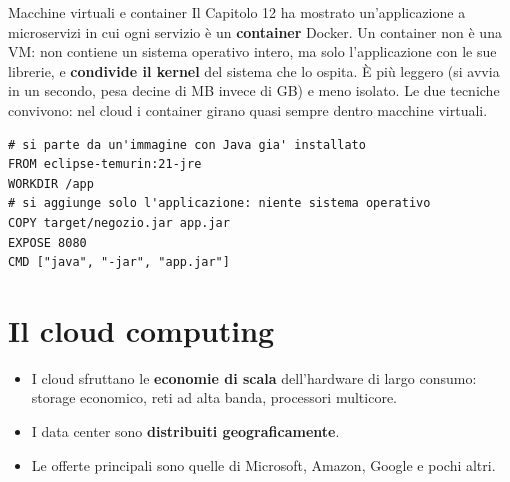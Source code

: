 \begin{infobox}{{Macchine virtuali e container}}
  Il Capitolo 12 ha mostrato un'applicazione a microservizi in cui ogni servizio è un \textbf{container} Docker. Un
  container non è una VM: non contiene un sistema operativo intero, ma solo l'applicazione con le sue librerie, e
  \textbf{condivide il kernel} del sistema che lo ospita. È più leggero (si avvia in un secondo, pesa decine di MB invece
  di GB) e meno isolato. Le due tecniche convivono: nel cloud i container girano quasi sempre dentro macchine virtuali.
\begin{lstlisting}[style=docker, name=Dockerfile]
# si parte da un'immagine con Java gia' installato
FROM eclipse-temurin:21-jre
WORKDIR /app
# si aggiunge solo l'applicazione: niente sistema operativo
COPY target/negozio.jar app.jar
EXPOSE 8080
CMD ["java", "-jar", "app.jar"]
\end{lstlisting}
\end{infobox}

\section{Il cloud computing}


\begin{itemize}
  \item I cloud sfruttano le \textbf{economie di scala} dell'hardware di largo consumo: storage economico, reti ad alta
        banda, processori multicore.
  \item I data center sono \textbf{distribuiti geograficamente}.
  \item Le offerte principali sono quelle di Microsoft, Amazon, Google e pochi altri.
\end{itemize}

\begin{center}
\end{center}

